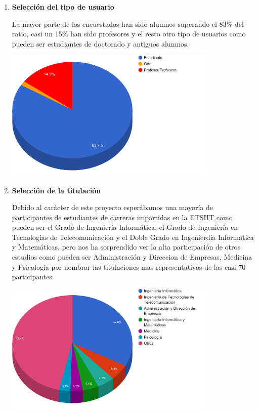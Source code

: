 \begin{enumerate}

  \item \textbf{Selección del tipo de usuario} 
  
  La mayor parte de los encuestados han sido alumnos superando el 83\% del ratio, casi un 15\% han sido profesores y el resto otro tipo de usuarios como pueden  ser estudiantes de doctorado y antiguos alumnos.
  
  
	\includegraphics[width=0.8\textwidth]{../charts/01_esusted}
  

  \item \textbf{Selección de la titulación} 
  
  Debido al carácter de este proyecto esperábamos una mayoría de participantes de estudiantes de carreras impartidas en la ETSIIT como pueden ser el Grado de Ingeniería Informática, el Grado de Ingeniería en Tecnologías de Telecomunicación y el Doble Grado en Ingenierdía Informática y Matemáticas, pero nos ha sorprendido ver la alta participación de otros estudios como pueden ser Administración y Direccion de Empresas, Medicina y Psicología por nombrar las titulaciones mas representativos de las casi 70 participantes.
  
  \includegraphics[width=0.8\textwidth]{../charts/02_titulacion}



\end{enumerate}
